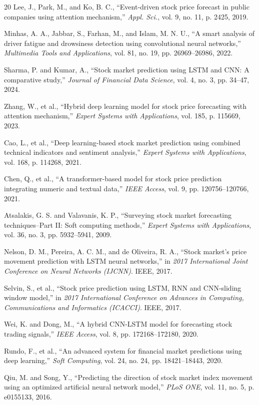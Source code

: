 \documentclass[conference]{IEEEtran}
\begin{document}
\begin{thebibliography}{20}
Lee, J., Park, M., and Ko, B. C., ``Event-driven stock price forecast in public companies using attention mechanism,'' \textit{Appl. Sci.}, vol. 9, no. 11, p. 2425, 2019.

Minhas, A. A., Jabbar, S., Farhan, M., and Islam, M. N. U., ``A smart analysis of driver fatigue and drowsiness detection using convolutional neural networks,'' \textit{Multimedia Tools and Applications}, vol. 81, no. 19, pp. 26969--26986, 2022.

Sharma, P. and Kumar, A., ``Stock market prediction using LSTM and CNN: A comparative study,'' \textit{Journal of Financial Data Science}, vol. 4, no. 3, pp. 34--47, 2024.

Zhang, W., et al., ``Hybrid deep learning model for stock price forecasting with attention mechanism,'' \textit{Expert Systems with Applications}, vol. 185, p. 115669, 2023.

Cao, L., et al., ``Deep learning-based stock market prediction using combined technical indicators and sentiment analysis,'' \textit{Expert Systems with Applications}, vol. 168, p. 114268, 2021.

Chen, Q., et al., ``A transformer-based model for stock price prediction integrating numeric and textual data,'' \textit{IEEE Access}, vol. 9, pp. 120756--120766, 2021.

Atsalakis, G. S. and Valavanis, K. P., ``Surveying stock market forecasting techniques--Part II: Soft computing methods,'' \textit{Expert Systems with Applications}, vol. 36, no. 3, pp. 5932--5941, 2009.

Nelson, D. M., Pereira, A. C. M., and de Oliveira, R. A., ``Stock market's price movement prediction with LSTM neural networks,'' in \textit{2017 International Joint Conference on Neural Networks (IJCNN)}. IEEE, 2017.

Selvin, S., et al., ``Stock price prediction using LSTM, RNN and CNN-sliding window model,'' in \textit{2017 International Conference on Advances in Computing, Communications and Informatics (ICACCI)}. IEEE, 2017.

Wei, K. and Dong, M., ``A hybrid CNN-LSTM model for forecasting stock trading signals,'' \textit{IEEE Access}, vol. 8, pp. 172168--172180, 2020.

Rundo, F., et al., ``An advanced system for financial market predictions using deep learning,'' \textit{Soft Computing}, vol. 24, no. 24, pp. 18421--18443, 2020.

Qiu, M. and Song, Y., ``Predicting the direction of stock market index movement using an optimized artificial neural network model,'' \textit{PLoS ONE}, vol. 11, no. 5, p. e0155133, 2016.

\end{thebibliography}
\end{document}
